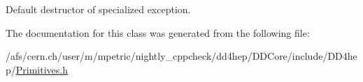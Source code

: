 Default destructor of specialized exception. 

The documentation for this class was generated from the following file:\begin{DoxyCompactItemize}
\item 
/afs/cern.ch/user/m/mpetric/nightly\_\-cppcheck/dd4hep/DDCore/include/DD4hep/\hyperlink{_primitives_8h}{Primitives.h}\end{DoxyCompactItemize}
